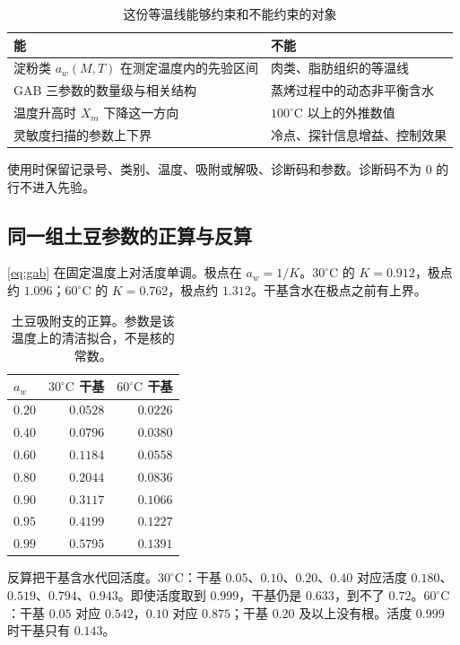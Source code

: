 \begin{table}[ht]
\centering
\caption{这份等温线能够约束和不能约束的对象}
\begin{tabularx}{\textwidth}{lX}
\toprule
能 & 不能 \\
\midrule
淀粉类 \(a_w(M,T)\) 在测定温度内的先验区间 & 肉类、脂肪组织的等温线 \\
GAB 三参数的数量级与相关结构 & 蒸烤过程中的动态非平衡含水 \\
温度升高时 \(X_m\) 下降这一方向 & \(100^\circ\mathrm{C}\) 以上的外推数值 \\
灵敏度扫描的参数上下界 & 冷点、探针信息增益、控制效果 \\
\bottomrule
\end{tabularx}
\end{table}

使用时保留记录号、类别、温度、吸附或解吸、诊断码和参数。诊断码不为 0 的行不进入先验。

\subsection{同一组土豆参数的正算与反算}

\eqref{eq:gab} 在固定温度上对活度单调。极点在 \(a_w=1/K\)。\(30^\circ\mathrm{C}\) 的 \(K=0.912\)，极点约 \(1.096\)；\(60^\circ\mathrm{C}\) 的 \(K=0.762\)，极点约 \(1.312\)。干基含水在极点之前有上界。

\begin{table}[ht]
\centering
\caption{土豆吸附支的正算。参数是该温度上的清洁拟合，不是核的常数。}
\begin{tabular}{lrr}
\toprule
\(a_w\) & \(30^\circ\mathrm{C}\) 干基 & \(60^\circ\mathrm{C}\) 干基 \\
\midrule
\(0.20\) & \(0.0528\) & \(0.0226\) \\
\(0.40\) & \(0.0796\) & \(0.0380\) \\
\(0.60\) & \(0.1184\) & \(0.0558\) \\
\(0.80\) & \(0.2044\) & \(0.0836\) \\
\(0.90\) & \(0.3117\) & \(0.1066\) \\
\(0.95\) & \(0.4199\) & \(0.1227\) \\
\(0.99\) & \(0.5795\) & \(0.1391\) \\
\bottomrule
\end{tabular}
\end{table}

反算把干基含水代回活度。\(30^\circ\mathrm{C}\)：干基 \(0.05\)、\(0.10\)、\(0.20\)、\(0.40\) 对应活度 \(0.180\)、\(0.519\)、\(0.794\)、\(0.943\)。即使活度取到 \(0.999\)，干基仍是 \(0.633\)，到不了 \(0.72\)。\(60^\circ\mathrm{C}\)：干基 \(0.05\) 对应 \(0.542\)，\(0.10\) 对应 \(0.875\)；干基 \(0.20\) 及以上没有根。活度 \(0.999\) 时干基只有 \(0.143\)。

